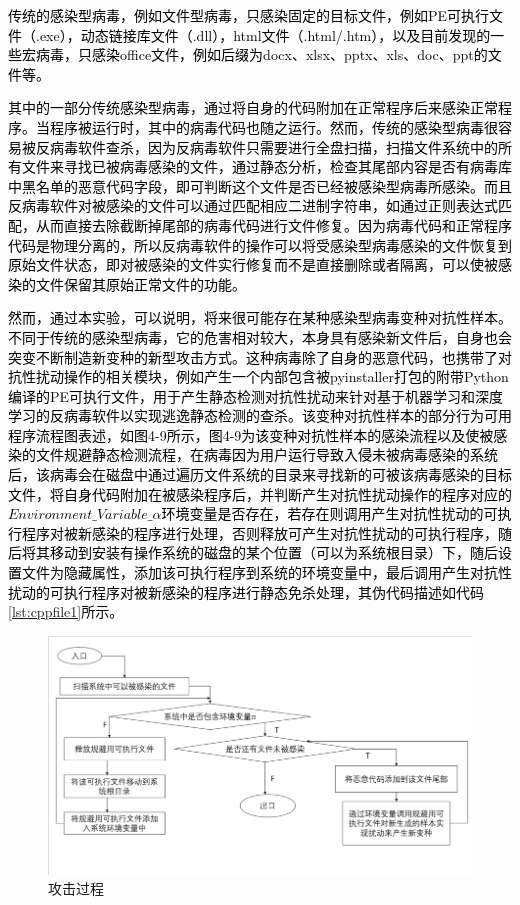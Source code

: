 \textcolor{black}{传统的感染型病毒，例如文件型病毒，只感染固定的目标文件\cite{ref37}，例如PE可执行文件（.exe），动态链接库文件（.dll），html文件（.html/.htm），以及目前发现的一些宏病毒，只感染office文件，例如后缀为docx、xlsx、pptx、xls、doc、ppt的文件等。}

\textcolor{black}{其中的一部分传统感染型病毒，通过将自身的代码附加在正常程序后来感染正常程序。当程序被运行时，其中的病毒代码也随之运行。然而，传统的感染型病毒很容易被反病毒软件查杀，因为反病毒软件只需要进行全盘扫描，扫描文件系统中的所有文件来寻找已被病毒感染的文件，通过静态分析，检查其尾部内容是否有病毒库中黑名单的恶意代码字段，即可判断这个文件是否已经被感染型病毒所感染。而且反病毒软件对被感染的文件可以通过匹配相应二进制字符串，如通过正则表达式匹配，从而直接去除截断掉尾部的病毒代码进行文件修复。因为病毒代码和正常程序代码是物理分离的，所以反病毒软件的操作可以将受感染型病毒感染的文件恢复到原始文件状态，即对被感染的文件实行修复而不是直接删除或者隔离，可以使被感染的文件保留其原始正常文件的功能。}

\textcolor{black}{然而，通过本实验，可以说明，将来很可能存在某种感染型病毒变种对抗性样本。不同于传统的感染型病毒，它的危害相对较大，本身具有感染新文件后，自身也会突变不断制造新变种的新型攻击方式。这种病毒除了自身的恶意代码，也携带了对抗性扰动操作的相关模块，例如产生一个内部包含被pyinstaller打包的附带Python编译的PE可执行文件，用于产生静态检测对抗性扰动来针对基于机器学习和深度学习的反病毒软件以实现逃逸静态检测的查杀。该变种对抗性样本的部分行为可用程序流程图表述，如图4-9所示，图4-9为该变种对抗性样本的感染流程以及使被感染的文件规避静态检测流程，在病毒因为用户运行导致入侵未被病毒感染的系统后，该病毒会在磁盘中通过遍历文件系统的目录来寻找新的可被该病毒感染的目标文件，将自身代码附加在被感染程序后，并判断产生对抗性扰动操作的程序对应的$Environment\_Variable\_\alpha$环境变量是否存在，若存在则调用产生对抗性扰动的可执行程序对被新感染的程序进行处理，否则释放可产生对抗性扰动的可执行程序，随后将其移动到安装有操作系统的磁盘的某个位置（可以为系统根目录）下，随后设置文件为隐藏属性，添加该可执行程序到系统的环境变量中，最后调用产生对抗性扰动的可执行程序对被新感染的程序进行静态免杀处理，其伪代码描述如代码\ref{lst:cppfile1}所示。}

\begin{figure}
  \centering
  \includegraphics[]{images/attack.png}
  \caption{攻击过程}\label{fig:attack}
\end{figure}

